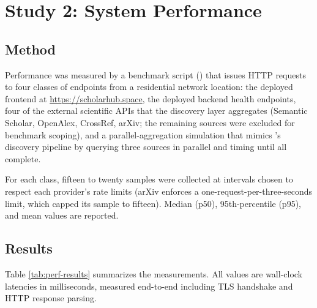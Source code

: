 \section{Study 2: System Performance}
\label{sec:eval-study2}

\subsection{Method}

Performance was measured by a benchmark script () that issues HTTP requests to four classes of endpoints from a residential network location: the deployed frontend at \url{https://scholarhub.space}, the deployed backend health endpoints, four of the external scientific APIs that the discovery layer aggregates (Semantic Scholar, OpenAlex, CrossRef, arXiv; the remaining sources were excluded for benchmark scoping), and a parallel-aggregation simulation that mimics \sh{}'s discovery pipeline by querying three sources in parallel and timing until all complete.

For each class, fifteen to twenty samples were collected at intervals chosen to respect each provider's rate limits (arXiv enforces a one-request-per-three-seconds limit, which capped its sample to fifteen). Median (p50), 95th-percentile (p95), and mean values are reported.

\subsection{Results}

Table \ref{tab:perf-results} summarizes the measurements. All values are wall-clock latencies in milliseconds, measured end-to-end including TLS handshake and HTTP response parsing.

